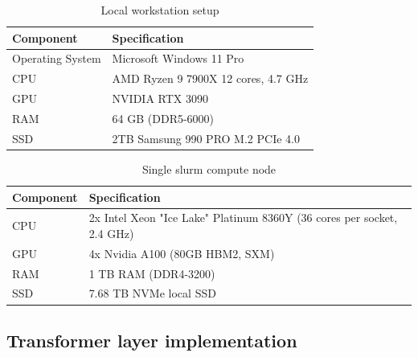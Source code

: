 \begin{table}[H]
    \centering
    \begin{tabularx}{0.90\textwidth}{|X|X|}
    \hline
    \textbf{Component} & \textbf{Specification} \\ \hline
    Operating System & Microsoft Windows 11 Pro \\ \hline
    CPU & AMD Ryzen 9 7900X 12 cores, 4.7 GHz \\ \hline
    GPU & NVIDIA RTX 3090 \\ \hline
    RAM & 64 GB (DDR5-6000) \\ \hline
    SSD & 2TB Samsung 990 PRO M.2 PCIe 4.0 \\ \hline
    \end{tabularx}
    \caption{Local workstation setup}
    \label{table:workstation_setup}
\end{table}
    
\begin{table}[H]
    \centering
    \begin{tabularx}{0.90\textwidth}{|X|X|}
    \hline
    \textbf{Component} & \textbf{Specification} \\ \hline
    CPU & 2x Intel Xeon "Ice Lake" Platinum 8360Y (36 cores per socket, 2.4 GHz) \\ \hline
    GPU & 4x Nvidia A100 (80GB HBM2, SXM) \\ \hline
    RAM & 1 TB RAM (DDR4-3200) \\ \hline
    SSD & 7.68 TB NVMe local SSD \\ \hline
    \end{tabularx}
    \caption{Single slurm compute node}
    \label{table:server_setup}
\end{table}

\newpage

\subsection{Transformer layer implementation}
\label{sec:transformer_layer_Python}


